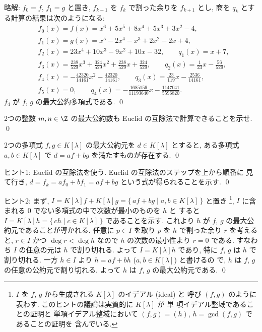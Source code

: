 \documentclass[12pt,twoside]{jarticle}
\newcommand\commentout[1]{#1}
\newcommand\commentout[1]{}
\begin{document}
\commentout{
\medskip
\noindent
略解: $f_0=f$, $f_1=g$ と置き, $f_{k-1}$ を $f_k$ で割った余りを $f_{k+1}$ 
とし, 商を $q_k$ とする計算の結果は次のようになる:
\begin{align*}
  &
  f_0(x) = f(x) = x^6+5x^5+8x^4+5x^3+3x^2-4,
  \\ &
  f_1(x) = g(x) = x^5-2x^4-x^3+2x^2-2x+4,
  \\ &
  f_2(x) = 23x^4+10x^3-9x^2+10x-32,
  \qquad
  q_1(x) = x+7,
  \\ &
  f_3(x)
  =\frac{238}{529}x^3+\frac{324}{529}x^2
  +\frac{238}{529}x  +\frac{324}{529},
  \qquad
  q_2(x) = \frac{1}{23}x - \frac{56}{529},
  \\ &
  f_4(x) = - \frac{42320}{14161}x^2 - \frac{42320}{14161},
  \qquad
  q_3(x) = \frac{23}{119}x - \frac{2536}{14161},
  \\ &
  f_5(x) = 0,
  \qquad
  q_4(x) = - \frac{1685159}{11193640}x - \frac{1147041}{5596820}.
\end{align*}
$f_4$ が $f$, $g$ の最大公約多項式である. \qed
}


\begin{question}
  2つの整数 $m,n\in\Z$ の最大公約数も Euclid の互除法で計算できることを示せ.
  \qed 
\end{question}


\begin{question}
\label{q:Euclidean-algorithm-2}
  2つの多項式 $f,g\in K[\lambda]$ の最大公約元を $d\in K[\lambda]$ とすると,
  ある多項式 $a,b\in K[\lambda]$ で $d = af + bg$ を満たすものが存在する. 
  \qed
\end{question}

\noindent
ヒント1: Euclid の互除法を使う.  Euclid の互除法のステップを上から順番に
見て行き, $d=f_k=af_0+bf_1=af+bg$ という式が得られることを示す.
\qed

\medskip
\noindent
ヒント2: まず, $I=K[\lambda]f+K[\lambda]g
=\{\,af+bg\mid a,b\in K[\lambda]\,\}$ と置き%
\footnote{$I$ を $f$, $g$ から生成される $K[\lambda]$ のイデアル (ideal) と
  呼び $(f,g)$ のように表わす.  このヒントの議論は実質的に $K[\lambda]$ が
  単 項イデアル整域であることの証明と
  単項イデアル整域において $(f,g)=(h)$, $h=\gcd(f,g)$ であることの証明を
  含んでいる.},
$I$ に含まれる $0$ でない多項式の中で次数が最小のものを $h$ と
すると $I=K[\lambda]h=\{\,ch\mid c\in K[\lambda]\,\}$ であることを示す.
これより $h$ が $f$, $g$ の最大公約元であることが導かれる.
任意に $p\in I$ を取り $p$ を $h$ で割った余り $r$ を考えると, 
$r\in I$ かつ $\deg r<\deg h$ なので $h$ の次数の最小性より $r=0$ である.
すなわち $I$ の任意の元は $h$ で割り切れる. 
よって $I=K[\lambda]h$ であり, 特に $f$, $g$ は $h$ で割り切れる.
一方 $h\in I$ より $h=af+bh$ ($a,b\in K[\lambda]$) と書けるの
で, $h$ は $f$, $g$ の任意の公約元で割り切れる.
よって $h$ は $f$, $g$ の最大公約元である.
\qed
\end{document}
